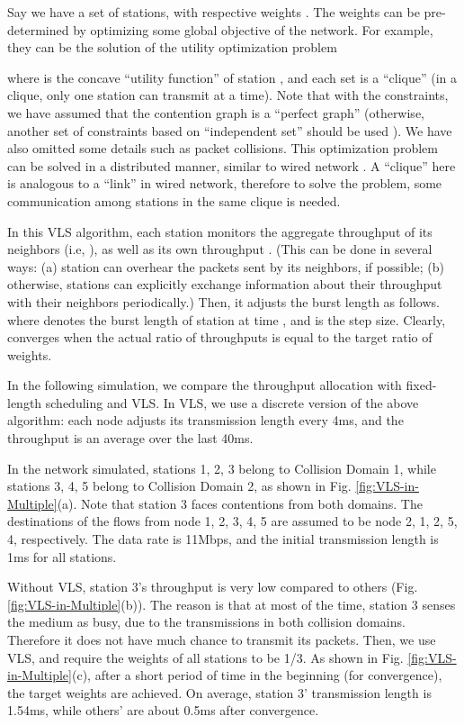 \documentclass[letterpaper, 10 pt, conference]{ieeeconf}
\begin{document}
Say we have a set of  stations, with respective weights .
The weights can be pre-determined by optimizing some global objective
of the network. For example, they can be the solution of the utility
optimization problem \cite{kelly97charging}\cite{tutorial_wireless}

where  is the concave {}``utility function'' of station
, and each set  is a {}``clique'' (in a clique,
only one station can transmit at a time). Note that with the constraints, we
have assumed that the contention graph is a ``perfect graph'' \cite{ad_hoc_constraints} (otherwise, another set of constraints based on ``independent set'' should be used \cite{ad_hoc_constraints}).
We have also omitted some details such as packet collisions. This optimization
problem can be solved in a distributed manner, similar to wired network
\cite{kelly97charging}. A {}``clique'' here is analogous to a {}``link''
in wired network, therefore to solve the problem, some communication
among stations in the same clique is needed.

In this VLS algorithm, each station  monitors the aggregate throughput
of its neighbors  (i.e, ),
as well as its own throughput . (This can be done in several
ways: (a) station  can overhear the packets sent by its neighbors,
if possible; (b) otherwise, stations can explicitly exchange information
about their throughput with their neighbors periodically.) Then, it
adjusts the burst length as follows.
where  denotes the burst length of station  at time
, and  is the step size. Clearly,  converges
when the actual ratio of throughputs is equal to the target ratio
of weights.

In the following simulation, we compare the throughput allocation
with fixed-length scheduling and VLS. In VLS, we use a discrete version
of the above algorithm: each node adjusts its transmission length
every 4ms, and the throughput  is an average over the last
40ms.

In the network simulated, stations 1, 2, 3 belong to Collision Domain
1, while stations 3, 4, 5 belong to Collision Domain 2, as shown in
Fig. \ref{fig:VLS-in-Multiple}(a). Note that station 3 faces contentions
from both domains. The destinations of the flows from node 1, 2, 
3, 4, 5 are assumed to be node 2, 1, 2, 5, 4, respectively. 
The data rate is 11Mbps, and the initial transmission
length is 1ms for all stations.

Without VLS, station 3's throughput is very low compared to others
(Fig. \ref{fig:VLS-in-Multiple}(b)). The reason is that at most of
the time, station 3 senses the medium as busy, due to the transmissions
in both collision domains. Therefore it does not have much chance
to transmit its packets. Then, we use VLS, and require the weights
of all stations to be 1/3. As shown in Fig. \ref{fig:VLS-in-Multiple}(c),
after a short period of time in the beginning (for convergence), the
target weights are achieved. On average, station 3' transmission length
is 1.54ms, while others' are about 0.5ms after convergence.
\end{document}
